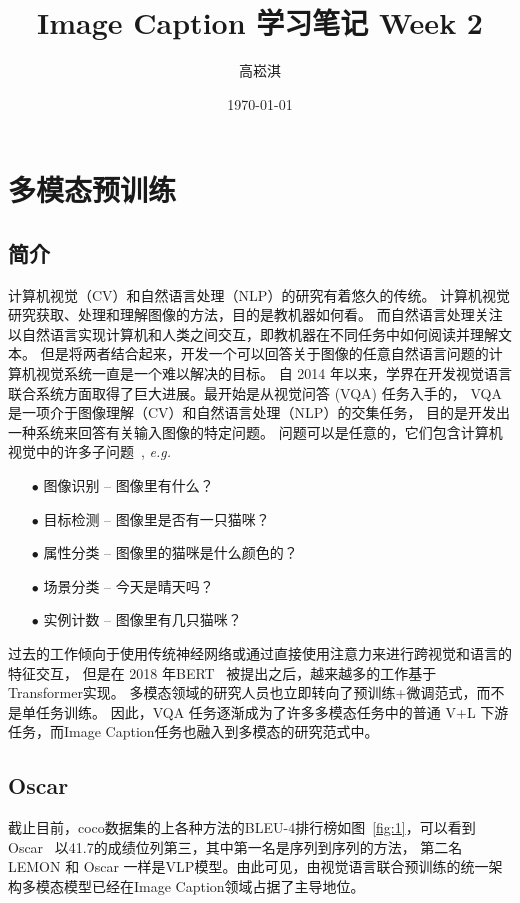\documentclass[UTF8]{ctexart}
\title{Image Caption 学习笔记 Week 2}
\author{高崧淇}
\date{\today}
\begin{document}
\maketitle
\tableofcontents

\section{多模态预训练}

\subsection{简介}
计算机视觉（CV）和自然语言处理（NLP）的研究有着悠久的传统。
计算机视觉研究获取、处理和理解图像的方法，目的是教机器如何看。
而自然语言处理关注以自然语言实现计算机和人类之间交互，即教机器在不同任务中如何阅读并理解文本。
但是将两者结合起来，开发一个可以回答关于图像的任意自然语言问题的计算机视觉系统一直是一个难以解决的目标。
自 2014 年以来，学界在开发视觉语言联合系统方面取得了巨大进展。最开始是从视觉问答 (VQA) 任务入手的，
VQA是一项介于图像理解（CV）和自然语言处理（NLP）的交集任务， 目的是开发出一种系统来回答有关输入图像的特定问题。
问题可以是任意的，它们包含计算机视觉中的许多子问题~\cite{ref1}, {\em e.g.}

\begin{itemize}
    \item[$\bullet$] 图像识别 – 图像里有什么？
    \item[$\bullet$] 目标检测 – 图像里是否有一只猫咪？
    \item[$\bullet$] 属性分类 – 图像里的猫咪是什么颜色的？
    \item[$\bullet$] 场景分类 – 今天是晴天吗？
    \item[$\bullet$] 实例计数 – 图像里有几只猫咪？
\end{itemize}

过去的工作倾向于使用传统神经网络或通过直接使用注意力来进行跨视觉和语言的特征交互，
但是在 2018 年BERT~\cite{ref_bert} 被提出之后，越来越多的工作基于 Transformer实现。
多模态领域的研究人员也立即转向了预训练+微调范式，而不是单任务训练。
因此，VQA 任务逐渐成为了许多多模态任务中的普通 V+L 下游任务，而Image Caption任务也融入到多模态的研究范式中。

\subsection{Oscar}\label{subsec:oscar}
截止目前，coco数据集的上各种方法的BLEU-4排行榜如图~\ref{fig:1}，可以看到 Oscar~\cite{ref_oscar} 以41.7的成绩位列第三，其中第一名是序列到序列的方法，
第二名 LEMON 和 Oscar 一样是VLP模型。由此可见，由视觉语言联合预训练的统一架构多模态模型已经在Image Caption领域占据了主导地位。
\end{document}

